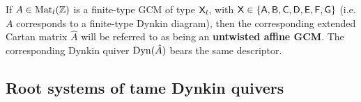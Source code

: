             \begin{definition} \label{def: untwisted_affine_generalised_cartan_matrices_and_dynkin_quivers}
                If $A \in \mathrm{Mat}_l(\mathbb{Z})$ is a finite-type GCM of type $\mathsf{X}_l$, with $\mathsf{X} \in \{\mathsf{A}, \mathsf{B}, \mathsf{C}, \mathsf{D}, \mathsf{E}, \mathsf{F}, \mathsf{G}\}$ (i.e. $A$ corresponds to a finite-type Dynkin diagram), then the corresponding extended Cartan matrix $\hat{A}$ will be referred to as being an \textbf{untwisted affine GCM}. The corresponding Dynkin quiver $\mathrm{Dyn}(\hat{A})$ bears the same descriptor. 
            \end{definition}
            
    \subsection{Root systems of tame Dynkin quivers}
